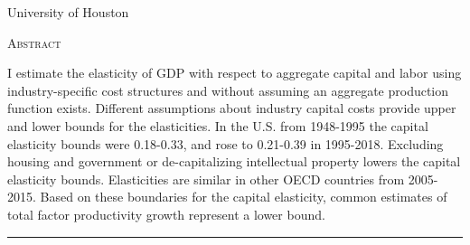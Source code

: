 \documentclass[11pt]{article}
\begin{document}
\begin{titlepage}
\vspace{2in} \noindent {\large \today}

\vspace{.5in} 

\vspace{.25in} 

\vspace{.05in} \noindent University of Houston

\vfill \noindent \textsc{Abstract} \hrulefill

\vspace{.05in} \noindent I estimate the elasticity of GDP with respect to aggregate capital and labor using industry-specific cost structures and without assuming an aggregate production function exists. Different assumptions about industry capital costs provide upper and lower bounds for the elasticities. In the U.S. from 1948-1995 the capital elasticity bounds were 0.18-0.33, and rose to 0.21-0.39 in 1995-2018. Excluding housing and government or de-capitalizing intellectual property lowers the capital elasticity bounds. Elasticities are similar in other OECD countries from 2005-2015. Based on these boundaries for the capital elasticity, common estimates of total factor productivity growth represent a lower bound. 

\vspace{.1in} \hrule

\vspace{.5in} 

\vspace{.1in} 

\vspace{.1in} 
\end{titlepage}

\pagebreak 
\end{document}
